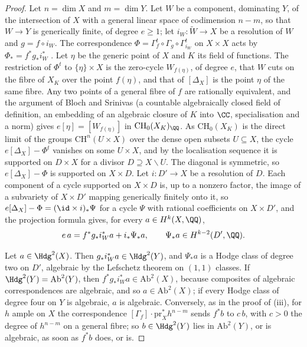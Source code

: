 \begin{proof}
Let $n=\dim X$ and $m=\dim Y$. Let $W$ be a component, dominating $Y$, of the
intersection of $X$ with a general linear space of codimension $n-m$, so that
$W\to Y$ is generically finite, of degree $e\ge1$; let
$i_{W}\colon\widetilde W\to X$ be a resolution of $W$ \cite{Hir64} and
$g=f\circ i_{W}$. The correspondence
$\Phi=\Gamma_{f}^{t}\circ\Gamma_{g}\circ\Gamma_{i_{W}}^{t}$ on $X\times X$
acts by $\Phi_{*}=f^{*}g_{*}i_{W}^{*}$ \cite[Chapter~16]{Ful98}. Let $\eta$ be
the generic point of $X$ and $K$ its field of functions. The restriction of
$\Phi^{t}$ to $\{\eta\}\times X$ is the zero-cycle $W_{f(\eta)}$, of degree
$e$, that $W$ cuts on the fibre of $X_{K}$ over the point $f(\eta)$, and that
of $[\Delta_{X}]$ is the point $\eta$ of the same fibre. Any two points of a
general fibre of $f$ are rationally equivalent, and the argument of Bloch and
Srinivas \cite{BS83} (a countable algebraically closed field of definition,
an embedding of an algebraic closure of $K$ into $\CC$, specialisation and a
norm) gives $e[\eta]=[W_{f(\eta)}]$ in $\mathrm{CH}_{0}(X_{K})_{\QQ}$. As
$\mathrm{CH}_{0}(X_{K})$ is the direct limit of the groups
$\mathrm{CH}^{n}(U\times X)$ over the dense open subsets $U\subseteq X$, the
cycle $e[\Delta_{X}]-\Phi^{t}$ vanishes on some $U\times X$, and by the
localisation sequence \cite[Chapter~1]{Ful98} it is supported on $D\times X$
for a divisor $D\supseteq X\smallsetminus U$. The diagonal is symmetric, so
$e[\Delta_{X}]-\Phi$ is supported on $X\times D$. Let $i\colon D'\to X$ be a
resolution of $D$. Each component of a cycle supported on $X\times D$ is, up
to a nonzero factor, the image of a subvariety of $X\times D'$ mapping
generically finitely onto it, so $e[\Delta_{X}]-\Phi=(\id\times i)_{*}\Psi$
for a cycle $\Psi$ with rational coefficients on $X\times D'$, and the
projection formula gives, for every $a\in H^{k}(X,\QQ)$,
\[
  e\,a=f^{*}g_{*}i_{W}^{*}a+i_{*}\Psi_{*}a,\qquad
  \Psi_{*}a\in H^{k-2}(D',\QQ).
\]

Let $a\in\Hdg^{2}(X)$. Then $g_{*}i_{W}^{*}a\in\Hdg^{2}(Y)$, and
$\Psi_{*}a$ is a Hodge class of degree two on $D'$, algebraic by the
Lefschetz theorem on $(1,1)$ classes. If $\Hdg^{2}(Y)=\mathrm{Ab}^{2}(Y)$,
then $f^{*}g_{*}i_{W}^{*}a\in\mathrm{Ab}^{2}(X)$, because composites of
algebraic correspondences are algebraic, and so $a\in\mathrm{Ab}^{2}(X)$; if
every Hodge class of degree four on $Y$ is algebraic, $a$ is algebraic.
Conversely, as in the proof of (iii), for $h$ ample on
$X$ the correspondence $[\Gamma_{f}]\cdot\mathrm{pr}_{X}^{*}h^{n-m}$ sends
$f^{*}b$ to $c\,b$, with $c>0$ the degree of $h^{n-m}$ on a general fibre;
so $b\in\Hdg^{2}(Y)$ lies in $\mathrm{Ab}^{2}(Y)$, or is algebraic, as soon
as $f^{*}b$ does, or is.


\end{proof}

